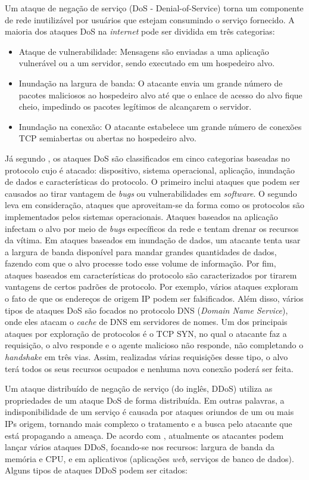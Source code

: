 Um ataque de negação de serviço (DoS - Denial-of-Service) torna um componente de rede inutilizável por usuários que estejam consumindo o serviço fornecido. A maioria dos ataques DoS na \textit{internet} pode ser dividida em três categorias: \cite{kurose}
\begin{itemize}
	\item Ataque de vulnerabilidade: Mensagens são enviadas a uma aplicação vulnerável ou a um servidor, sendo executado em um hospedeiro alvo.
	\item Inundação na largura de banda: O atacante envia um grande número de pacotes maliciosos ao hospedeiro alvo até que o enlace de acesso do alvo fique cheio, impedindo os pacotes legítimos de alcançarem o servidor. 
	\item Inundação na conexão: O atacante estabelece um grande número de conexões TCP semiabertas ou abertas no hospedeiro alvo. 
\end{itemize}
Já segundo , os ataques DoS são classificados em cinco categorias baseadas no protocolo cujo é atacado: dispositivo, sistema operacional, aplicação, inundação de dados e características do protocolo. O primeiro inclui ataques que podem ser causados ao tirar vantagem de \textit{bugs} ou vulnerabilidades em \textit{software}. O segundo leva em consideração, ataques que aproveitam-se da forma como os protocolos são implementados pelos sistemas operacionais. Ataques baseados na aplicação infectam o alvo por meio de \textit{bugs} específicos da rede e tentam drenar os recursos da vítima. Em ataques baseados em inundação de dados, um atacante tenta usar a largura de banda disponível para mandar grandes quantidades de dados, fazendo com que o alvo processe todo esse volume de informação. Por fim, ataques baseados em características do protocolo são caracterizados por tirarem vantagens de certos padrões de protocolo. Por exemplo, vários ataques exploram o fato de que os endereços de origem IP podem ser falsificados. Além disso, vários tipos de ataques DoS são focados no protocolo DNS (\textit{Domain Name Service}), onde eles atacam o \textit{cache} de DNS em servidores de nomes. Um dos principais ataques por exploração de protocolos é o TCP SYN, no qual o atacante faz a requisição, o alvo responde e o agente malicioso não responde, não completando o \textit{handshake} em três vias. Assim, realizadas várias requisições desse tipo, o alvo terá todos os seus recursos ocupados e nenhuma nova conexão poderá ser feita. 
 
Um ataque distribuído de negação de serviço (do inglês, DDoS) utiliza as propriedades de um ataque DoS de forma distribuída. Em outras palavras, a indisponibilidade de um serviço é causada por ataques oriundos de um ou mais IPs origem, tornando mais complexo o tratamento e a busca pelo atacante que está propagando a ameaça. De acordo com , atualmente os atacantes podem lançar vários ataques DDoS, focando-se nos recursos: largura de banda da memória e CPU, e em aplicativos (aplicações \textit{web}, serviços de banco de dados). Alguns tipos de ataques DDoS podem ser citados:\cite{DataMining}

